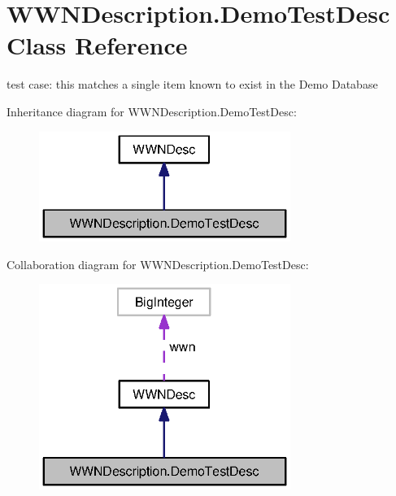 \section{W\-W\-N\-Description.\-Demo\-Test\-Desc Class Reference}
\label{classorg_1_1smallfoot_1_1wwn_1_1WWNDescription_1_1DemoTestDesc}


test case\-: this matches a single item known to exist in the Demo Database  




Inheritance diagram for W\-W\-N\-Description.\-Demo\-Test\-Desc\-:\nopagebreak
\begin{figure}[H]
\begin{center}
\leavevmode
\includegraphics[width=232pt]{classorg_1_1smallfoot_1_1wwn_1_1WWNDescription_1_1DemoTestDesc__inherit__graph}
\end{center}
\end{figure}


Collaboration diagram for W\-W\-N\-Description.\-Demo\-Test\-Desc\-:\nopagebreak
\begin{figure}[H]
\begin{center}
\leavevmode
\includegraphics[width=232pt]{classorg_1_1smallfoot_1_1wwn_1_1WWNDescription_1_1DemoTestDesc__coll__graph}
\end{center}
\end{figure}
